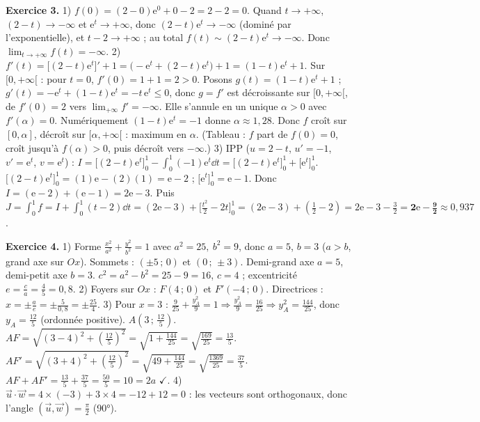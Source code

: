 \noindent\textbf{Exercice 3.}
1) $f(0)=(2-0)\mathrm{e}^{0}+0-2=2-2=0$. Quand $t\to+\infty$, $(2-t)\to-\infty$ et $\mathrm{e}^t\to+\infty$,
donc $(2-t)\mathrm{e}^t\to-\infty$ (dominé par l'exponentielle), et $t-2\to+\infty$ ; au total
$f(t)\sim(2-t)\mathrm{e}^t\to-\infty$. Donc $\displaystyle\lim_{t\to+\infty}f(t)=-\infty$.
2) $f'(t)=\big[(2-t)\mathrm{e}^t\big]'+1=\big(-\mathrm{e}^t+(2-t)\mathrm{e}^t\big)+1=(1-t)\mathrm{e}^t+1$.
Sur $[0,+\infty[$ : pour $t=0$, $f'(0)=1+1=2>0$. Posons $g(t)=(1-t)\mathrm{e}^t+1$ ;
$g'(t)=-\mathrm{e}^t+(1-t)\mathrm{e}^t=-t\,\mathrm{e}^t\le0$, donc $g=f'$ est décroissante sur $[0,+\infty[$,
de $f'(0)=2$ vers $\lim_{+\infty}f'=-\infty$. Elle s'annule en un unique $\alpha>0$ avec $f'(\alpha)=0$.
Numériquement $(1-t)\mathrm{e}^t=-1$ donne $\alpha\approx1{,}28$. Donc $f$ croît sur $[0,\alpha]$, décroît
sur $[\alpha,+\infty[$ : maximum en $\alpha$. (Tableau : $f$ part de $f(0)=0$, croît jusqu'à
$f(\alpha)>0$, puis décroît vers $-\infty$.)
3) IPP ($u=2-t$, $u'=-1$, $v'=\mathrm{e}^t$, $v=\mathrm{e}^t$) :
$I=\big[(2-t)\mathrm{e}^t\big]_0^1-\int_0^1(-1)\mathrm{e}^t\dd t=\big[(2-t)\mathrm{e}^t\big]_0^1+\big[\mathrm{e}^t\big]_0^1$.
$\big[(2-t)\mathrm{e}^t\big]_0^1=(1)\mathrm{e}-(2)(1)=\mathrm{e}-2$ ; $\big[\mathrm{e}^t\big]_0^1=\mathrm{e}-1$.
Donc $I=(\mathrm{e}-2)+(\mathrm{e}-1)=2\mathrm{e}-3$.
Puis $J=\int_0^1 f=I+\int_0^1(t-2)\dd t=(2\mathrm{e}-3)+\big[\tfrac{t^2}{2}-2t\big]_0^1
=(2\mathrm{e}-3)+(\tfrac12-2)=2\mathrm{e}-3-\tfrac32=\mathbf{2\mathrm{e}-\tfrac92}\approx0{,}937$.

\noindent\textbf{Exercice 4.}
1) Forme $\frac{x^2}{a^2}+\frac{y^2}{b^2}=1$ avec $a^2=25,\ b^2=9$, donc $a=5$, $b=3$ ($a>b$, grand axe sur $Ox$).
Sommets : $(\pm5\,;\,0)$ et $(0\,;\,\pm3)$. Demi-grand axe $a=5$, demi-petit axe $b=3$.
$c^2=a^2-b^2=25-9=16$, $c=4$ ; excentricité $e=\frac ca=\frac45=0{,}8$.
2) Foyers sur $Ox$ : $F(4\,;\,0)$ et $F'(-4\,;\,0)$. Directrices : $x=\pm\frac ae=\pm\frac{5}{0{,}8}=\pm\frac{25}{4}$.
3) Pour $x=3$ : $\frac{9}{25}+\frac{y_A^2}{9}=1\Rightarrow \frac{y_A^2}{9}=\frac{16}{25}\Rightarrow y_A^2=\frac{144}{25}$,
donc $y_A=\frac{12}{5}$ (ordonnée positive). $A(3\,;\,\frac{12}{5})$.
$AF=\sqrt{(3-4)^2+(\frac{12}{5})^2}=\sqrt{1+\frac{144}{25}}=\sqrt{\frac{169}{25}}=\frac{13}{5}$.
$AF'=\sqrt{(3+4)^2+(\frac{12}{5})^2}=\sqrt{49+\frac{144}{25}}=\sqrt{\frac{1369}{25}}=\frac{37}{5}$.
$AF+AF'=\frac{13}{5}+\frac{37}{5}=\frac{50}{5}=10=2a$ $\checkmark$.
4) $\vec u\cdot\vec w=4\times(-3)+3\times4=-12+12=0$ : les vecteurs sont orthogonaux,
donc l'angle $(\vec u,\vec w)=\frac\pi2$ (90°).

